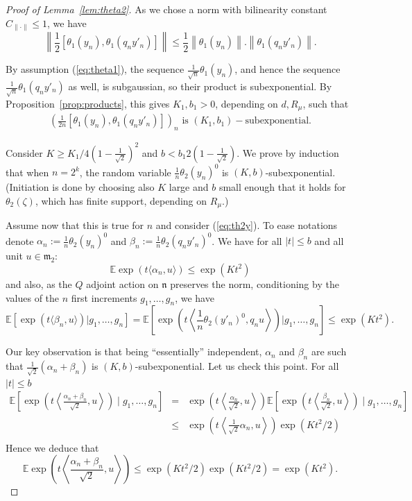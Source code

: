 \documentclass[10pt,a4paper]{amsart}
\newcommand{\E}{\mathbb{E}}
\begin{document}
\begin{proof}[Proof of Lemma~\ref{lem:theta2}]
As we chose a norm with bilinearity constant $C_{\|\cdot\|} \le 1$, we have
\[
\left\|\frac{1}{2}\left[ \theta_1(y_n),\theta_1(q_n y'_n)\right]\right\| \le \frac{1}{2} \left\| \theta_1(y_n)\right\| . \left\| \theta_1(q_ny'_n)\right\|.
\]

By assumption (\ref{eq:theta1}), the sequence $\frac{1}{\sqrt{n}}\theta_1(y_n)$, and hence the sequence $\frac{1}{\sqrt{n}}\theta_1(q_ny'_n)$ as well, is subgaussian, so their product is subexponential. By Proposition~\ref{prop:products}, this gives $K_1,b_1>0$, depending on $d,R_\mu$, such that
\begin{align}\label{eq:K1b1}
\left( \frac{1}{2n}\left[ \theta_1(y_n),\theta_1(q_n y'_n)\right] \right)_n \textrm{ is }(K_1,b_1)-\textrm{subexponential.}
\end{align}

Consider $K\ge K_1/4(1-\frac{1}{\sqrt{2}})^2$ and $b < b_1 2(1-\frac{1}{\sqrt{2}})$. We prove by induction that when $n=2^k$, the random variable $\frac{1}{n} \theta_2(y_n)^0$ is $(K,b)$-subexponential.
(Initiation is done by choosing also $K$ large and $b$ small enough that it holds for $\theta_2(\zeta)$, which has finite support, depending on $R_\mu$.)

Assume now that this is true for $n$ and consider (\ref{eq:th2y}). To ease notations denote $\alpha_n:=\frac{1}{n}\theta_2(y_n)^0$ and $\beta_n:= \frac{1}{n}\theta_2(q_ny'_n)^0$. We have for all $|t|\le b$ and all unit $u \in \mathfrak{m}_{2}$:
\[
\mathbb{E}\exp\left(t \langle \alpha_n ,u\rangle\right) \le \exp(Kt^2)
\]
and also, as the $Q$ adjoint action on $\mathfrak{n}$ preserves the norm, conditioning by the values of the $n$ first increments $g_1,\dots,g_n$, we have
\[
\mathbb{E}\left[\exp\left(t \langle \beta_n ,u\rangle\right)|g_1,\dots,g_n\right]=\mathbb{E}\left[\exp\left(t\left\langle\frac{1}{n}\theta_2(y'_n)^0,q_n u\right\rangle\right)|g_1,\dots,g_n\right] \le \exp(Kt^2).
\]


Our key observation is that being ``essentially'' independent, $\alpha_n$ and $\beta_n$ are such that 
$\frac{1}{\sqrt{2}}(\alpha_n+\beta_n)$ is $(K,b)$-subexponential. 
Let us check this point. For all $|t|\leq b$
\begin{eqnarray*}
\E\left[\exp\left(t\left\langle\frac{\alpha_n+\beta_n}{\sqrt{2}},u\right\rangle\right) \mid g_1,\dots,g_n\right]& = & \exp\left(t\left\langle\frac{\alpha_{n}}{\sqrt{2}},u\right\rangle\right) \E\left[\exp\left(t\left\langle\frac{\beta_{n}}{\sqrt{2}},u\right\rangle\right) \mid g_1,\dots,g_n\right]\\
                                                            & \leq &  \exp\left(t\left\langle\frac{1}{\sqrt{2}}\alpha_{n},u\right\rangle\right)\exp(Kt^2/2)\\
\end{eqnarray*}
Hence we deduce that 
\[\E\exp\left(t\left\langle\frac{\alpha_n+\beta_n}{\sqrt{2}},u\right\rangle\right)\leq \exp(Kt^2/2)\exp(Kt^2/2)=\exp(Kt^2).\]


\end{proof}
\end{document}
